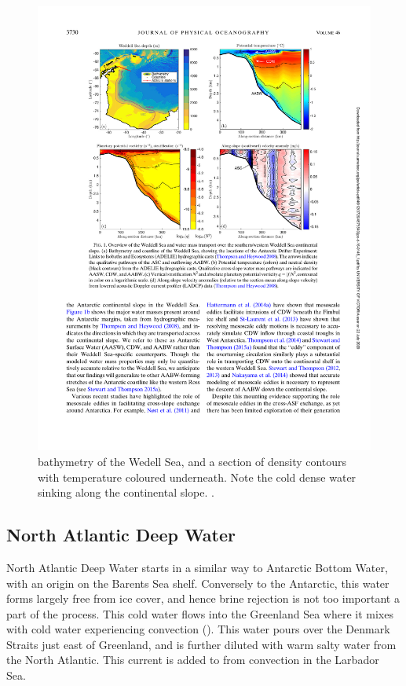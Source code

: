 \begin{figure}[hbt]
  \begin{center}
  \includegraphics{figs/WaterMasses/StewartThompson16Fig1}
    \caption{bathymetry of the Wedell Sea, and a section of density  contours with temperature coloured underneath.  Note the cold dense water sinking along the continental slope. \citep{stewartthompson16}.}
    \label{fig:stewartthompson16}  
  \end{center}
\end{figure}



\subsection{North Atlantic Deep Water}

North Atlantic Deep Water starts in a similar way to Antarctic Bottom Water, with an origin on the Barents Sea shelf.  Conversely to the Antarctic, this water forms largely free from ice cover, and hence brine rejection is not too important a part of the process.  This cold water flows into the Greenland Sea where it mixes with cold water experiencing convection ().  This water pours over the Denmark Straits just east of Greenland, and is further diluted with warm salty water from the North Atlantic.  This current is added to from convection in the Larbador Sea.  

